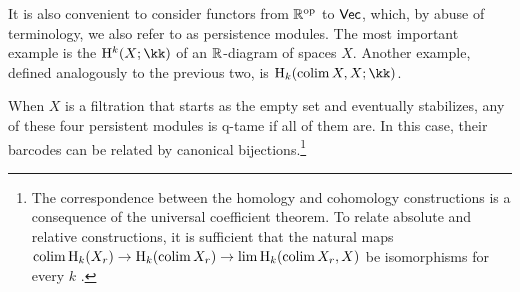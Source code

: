 It is also convenient to consider functors from $\R^\op$ to $\Vec$, which, by abuse of terminology, we also refer to as persistence modules.
The most important example is the  $\rH^k(X; \kk)$ of an $\R$-diagram of spaces $X$.
Another example, defined analogously to the previous two, is  $\rH_k(\colim X, X; \kk)$.

When $X$ is a filtration that starts as the empty set and eventually stabilizes, any of these four persistent modules is q-tame if all of them are.
In this case, their barcodes can be related by canonical bijections.\footnote{
The correspondence between the homology and cohomology constructions is a consequence of the universal coefficient theorem.
To relate absolute and relative constructions, it is sufficient that the natural maps $\colim \rH_k(X_r) \to \rH_k(\colim X_r) \to \lim \rH_k(\colim X_r, X)$ be isomorphisms for every $k$ \cite[Thm.~6.2]{bauer2023dualities}.}